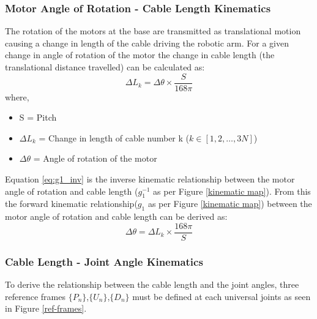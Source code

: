\documentclass[a4paper,12pt]{report}
\begin{document}
\subsubsection{Motor Angle of Rotation - Cable Length Kinematics}
The rotation of the motors at the base are transmitted as translational motion causing a change in length of the cable driving the robotic arm. For a given change in angle of rotation of the motor the change in cable length (the translational distance travelled) can be calculated as:
\begin{equation}
\label{eq:g1_inv}
\Delta L_{k} =\Delta \theta \times \frac{S}{168 \pi}
\end{equation}
where,
\begin{itemize}[label={--}]
	\item S = Pitch
	\item $\Delta L_{k}$ = Change in length of cable number k ($k \in [1,2,\ldots,3N]$) 
	\item $\Delta \theta$ = Angle of rotation of the motor
\end{itemize}

Equation \ref{eq:g1_inv} is the inverse kinematic relationship between the motor angle of rotation and cable length ($g_{1}^{-1}$ as per Figure \ref{kinematic map}). From this the forward kinematic relationship($g_{1}$ as per Figure \ref{kinematic map}) between the motor angle of rotation and cable length can be derived as:
\begin{equation}
\label{eq:g1}
\Delta \theta =\Delta L_{k} \times \frac{168 \pi}{S}
\end{equation}

\subsubsection{Cable Length - Joint Angle Kinematics}
To derive the relationship between the cable length and the joint angles, three reference frames $\{P_n\}$,$\{U_n\}$,$\{D_n\}$ must be defined at each universal joints as seen in Figure \ref{ref-frames}.
\end{document}
